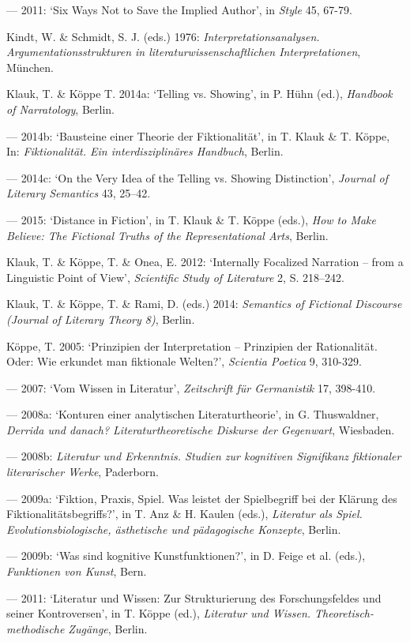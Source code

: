 \begin{hangparas}{.5cm}{1}
--- 2011: `Six Ways Not to Save the Implied Author', in \emph{Style} 45, 67-79.

Kindt, W. \& Schmidt, S. J. (eds.) 1976: \emph{Interpretationsanalysen. Argumentationsstrukturen in literaturwissenschaftlichen Interpretationen}, M\"unchen.

Klauk, T. \& K\"oppe T. 2014a: `Telling vs. Showing', in P. H\"uhn (ed.), \emph{Handbook of Narratology}, Berlin.

--- 2014b: `Bausteine einer Theorie der Fiktionalit\"at', in T. Klauk \& T. K\"oppe, In: \emph{Fiktionalit\"at. Ein interdisziplin\"ares Handbuch}, Berlin.

--- 2014c: `On the Very Idea of the Telling vs. Showing Distinction', \emph{Journal of Literary Semantics} 43, 25--42.

--- 2015: `Distance in Fiction', in T. Klauk \& T. K\"oppe (eds.), \emph{How to Make Believe: The Fictional Truths of the Representational Arts}, Berlin.

Klauk, T. \& K\"oppe, T. \& Onea, E. 2012: `Internally Focalized Narration -- from a Linguistic Point of View', \emph{Scientific Study of Literature} 2, S. 218--242.

Klauk, T. \& K\"oppe, T. \& Rami, D. (eds.) 2014: \emph{Semantics of Fictional Discourse (Journal of Literary Theory 8)}, Berlin.

K\"oppe, T. 2005: `Prinzipien der Interpretation -- Prinzipien der Rationalit\"at. Oder: Wie erkundet man fiktionale Welten?', \emph{Scientia Poetica} 9, 310-329.

--- 2007: `Vom Wissen in Literatur', \emph{Zeitschrift f\"ur Germanistik} 17, 398-410.

--- 2008a: `Konturen einer analytischen Literaturtheorie', in G. Thuswaldner, \emph{Derrida und danach? Literaturtheoretische Diskurse der Gegenwart}, Wiesbaden.

--- 2008b: \emph{Literatur und Erkenntnis. Studien zur kognitiven Signifikanz fiktionaler literarischer Werke}, Paderborn. 

--- 2009a: `Fiktion, Praxis, Spiel. Was leistet der Spielbegriff bei der Kl\"arung des Fiktionalit\"atsbegriffs?', in T. Anz \& H. Kaulen (eds.), \emph{Literatur als Spiel.  Evolutionsbiologische, \"asthetische und p\"adagogische Konzepte}, Berlin.

--- 2009b: `Was sind kognitive Kunstfunktionen?', in D. Feige et al. (eds.), \emph{Funktionen von Kunst}, Bern.

--- 2011: `Literatur und Wissen: Zur Strukturierung des Forschungsfeldes und seiner Kontroversen', in T. K\"oppe (ed.), \emph{Literatur und Wissen. Theoretisch-methodische Zug\"ange}, Berlin.


\end{hangparas}
